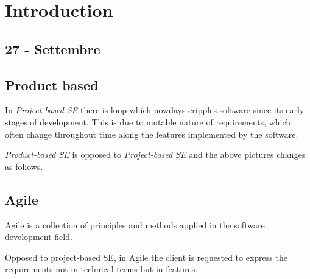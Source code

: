 \chapter{Introduction}
\section*{27 - Settembre}
\section{Product based}
In \textit{Project-based SE} there is loop which nowdays cripples software since its early stages of development.
This is due to mutable nature of requirements, which often change throughout time along the features implemented by the software.
\begin{center}
\end{center}

\textit{Product-based SE} is opposed to \textit{Project-based SE} and the above pictures changes as follows.

\begin{center}
\end{center}

\section{Agile}
Agile is a collection of principles and methods applied in the software development field.
\nl

Opposed to project-based SE, in Agile the client is requested to express the requirements not in technical terms but in features.

